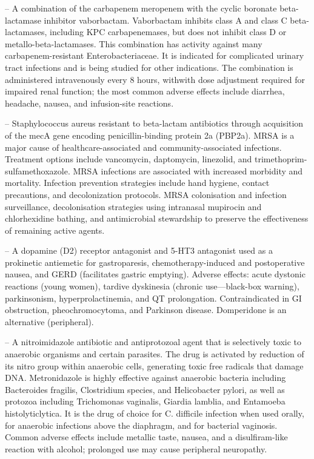 -- A combination of the carbapenem meropenem with the cyclic boronate beta-lactamase inhibitor vaborbactam. Vaborbactam inhibits class A and class C beta-lactamases, including KPC carbapenemases, but does not inhibit class D or metallo-beta-lactamases. This combination has activity against many carbapenem-resistant Enterobacteriaceae. It is indicated for complicated urinary tract infections and is being studied for other indications. The combination is administered intravenously every 8 hours, withwith dose adjustment required for impaired renal function; the most common adverse effects include diarrhea, headache, nausea, and infusion-site reactions.

-- Staphylococcus aureus resistant to beta-lactam antibiotics through acquisition of the mecA gene encoding penicillin-binding protein 2a (PBP2a). MRSA is a major cause of healthcare-associated and community-associated infections. Treatment options include vancomycin, daptomycin, linezolid, and trimethoprim-sulfamethoxazole. MRSA infections are associated with increased morbidity and mortality. Infection prevention strategies include hand hygiene, contact precautions, and decolonization protocols. MRSA colonisation and infection surveillance, decolonisation strategies using intranasal mupirocin and chlorhexidine bathing, and antimicrobial stewardship to preserve the effectiveness of remaining active agents.

-- A dopamine (D2) receptor antagonist and 5-HT3 antagonist used as a prokinetic antiemetic for gastroparesis, chemotherapy-induced and postoperative nausea, and GERD (facilitates gastric emptying). Adverse effects: acute dystonic reactions (young women), tardive dyskinesia (chronic use—black-box warning), parkinsonism, hyperprolactinemia, and QT prolongation. Contraindicated in GI obstruction, pheochromocytoma, and Parkinson disease. Domperidone is an alternative (peripheral).

-- A nitroimidazole antibiotic and antiprotozoal agent that is selectively toxic to anaerobic organisms and certain parasites. The drug is activated by reduction of its nitro group within anaerobic cells, generating toxic free radicals that damage DNA. Metronidazole is highly effective against anaerobic bacteria including Bacteroides fragilis, Clostridium species, and Helicobacter pylori, as well as protozoa including Trichomonas vaginalis, Giardia lamblia, and Entamoeba histolyticlytica. It is the drug of choice for C. difficile infection when used orally, for anaerobic infections above the diaphragm, and for bacterial vaginosis. Common adverse effects include metallic taste, nausea, and a disulfiram-like reaction with alcohol; prolonged use may cause peripheral neuropathy.

